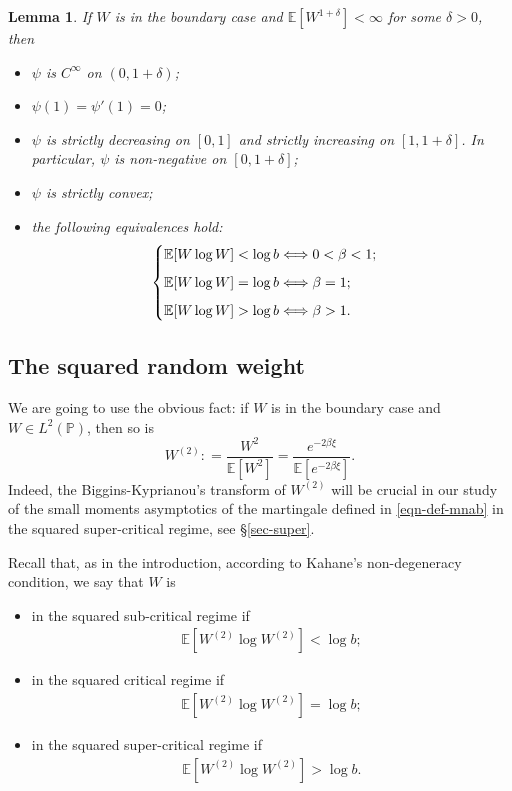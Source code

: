 \documentclass[12pt]{amsart}
\newtheorem{lemma}[theorem]{Lemma}
\theoremstyle{definition}
\theoremstyle{remark}
\newcommand{\E}{\mathbb{E}}
\newcommand{\PP}{\mathbb{P}}
\numberwithin{equation}{section}
\begin{document}
\begin{lemma}\label{lem-psi}
If $W$ is in the boundary case and  $\E[W^{1+\delta}]<\infty$  for some $\delta > 0$, then 
\begin{itemize}
\item $\psi$ is $C^\infty$ on $(0, 1+\delta)$; 
\item $\psi(1) = \psi'(1) = 0$; 
\item $\psi$ is strictly decreasing on $[0, 1]$ and strictly increasing on $[1, 1+\delta]$.  In particular, $\psi$ is non-negative on $[0, 1 + \delta]$;
\item $\psi$ is strictly convex;
\item  the following equivalences hold: 
\begin{align}\label{beta-less-1}
\begin{cases}
  \E [ W \log  W]<\log b \Longleftrightarrow 0< \beta<1; 
  \vspace{2mm}
  \\
  \E [ W \log  W] = \log b \Longleftrightarrow \beta = 1;
  \vspace{2mm}
\\
  \E [ W \log  W]>\log b \Longleftrightarrow \beta>1.
\end{cases}
\end{align}
\end{itemize}
\end{lemma}






\subsection{The squared random weight}





We are going to use the obvious fact: if  $W$ is in the boundary case and  $W\in L^2(\PP)$, then  so is 
\[
W^{(2)}: =   \frac{W^2}{\E[W^2]}=\frac{e^{-2\beta\xi}}{\E[e^{-2\beta\xi}]}.
\]
Indeed,  the Biggins-Kyprianou's transform of $W^{(2)}$ will be  crucial in our study of  the small moments asymptotics of the martingale defined in \eqref{eqn-def-mnab} in the squared super-critical regime,  see \S\ref{sec-super}. 

Recall that, as in the introduction,  according to Kahane's non-degeneracy condition, we say that  $W$ is 
\begin{itemize}
\item in the squared sub-critical regime if 
\begin{align}\label{sq-sub}
\E[  W^{(2)} \log W^{(2)}] <\log b;
\end{align}
\item in the  squared critical regime if 
\begin{align}\label{sq-critical}
\E[  W^{(2)} \log W^{(2)}]   = \log b;
\end{align}
\item  in the squared super-critical regime if 
\begin{align}\label{sq-super}
\E[  W^{(2)} \log W^{(2)}] > \log b.
\end{align}
\end{itemize}
\end{document}
